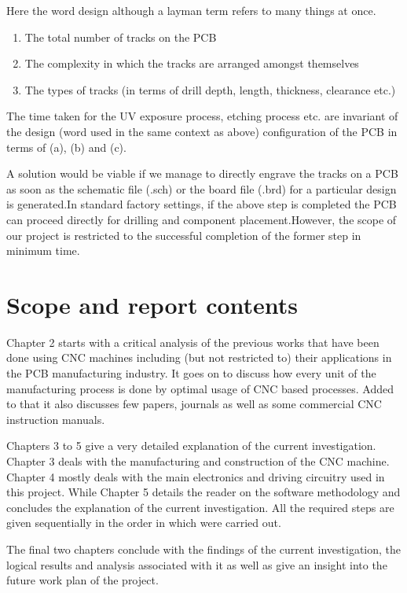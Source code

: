 Here the word design although a layman term refers to many things at once.
\begin{enumerate}
 \item The total number of tracks on the PCB
 \item The complexity in which the tracks are arranged amongst themselves
 \item The types of tracks (in terms of drill depth, length, thickness, clearance etc.)
\end{enumerate}

The time taken for the UV exposure process, etching process etc. are invariant of the design (word used in the same context as above) configuration of the PCB in terms of (a), (b) and (c). \par

A solution would be viable if we manage to directly engrave the tracks on a PCB as soon as the schematic file (.sch) or the board file (.brd) for a particular design is generated.In standard factory settings, if the above step is completed the PCB can proceed directly for drilling and component placement.However, the scope of our project is restricted to the successful completion of the former step in minimum time.



\section{Scope and report contents}
Chapter 2 starts with a critical analysis of the previous works that have been done using CNC machines including (but not restricted to) their applications in the PCB manufacturing industry. It goes on to discuss how every unit of the manufacturing process is done by optimal usage of CNC based processes. Added to that it also discusses few papers, journals as well as some commercial CNC instruction manuals. \par

Chapters 3 to 5 give a very detailed explanation of the current investigation. Chapter 3 deals with the manufacturing and construction of the CNC machine. Chapter 4 mostly deals with the main electronics and driving circuitry used in this project. While Chapter 5 details the reader on the software methodology and concludes the explanation of the current investigation. All the required steps are given sequentially in the order in which were carried out. \par

The final two chapters conclude with the findings of the current investigation, the logical results and analysis associated with it as well as give an insight into the future work plan of the project.
